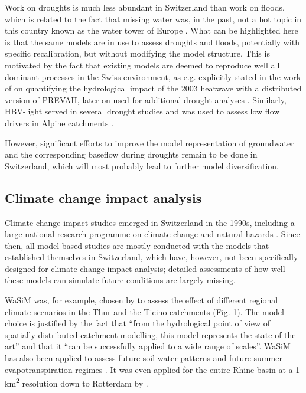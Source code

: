 \documentclass[10pt,a4paper]{article}
\begin{document}
Work on droughts is much less abundant in Switzerland than work on
floods, which is related to the fact that missing water was, in the
past, not a hot topic in this country known as the water tower of
Europe \citep{Milano2015}. What can be highlighted here is that the same
models are in use to assess droughts and floods, potentially with
specific recalibration, but without modifying the model structure. This
is motivated by the fact that existing models are deemed to reproduce
well all dominant processes in the Swiss environment, as e.g. explicitly
stated in the work of \citet{Zappa2007a} on quantifying the hydrological
impact of the 2003 heatwave with a distributed version of PREVAH, later
on used for additional drought analyses \citep{Brunner2019,Zappa2019}. Similarly,
HBV-light served in several drought studies \citep{Staudinger2014,Staudinger2014a,Staudinger2015} 
and was used to assess low flow drivers in Alpine catchments \citep{Arnoux_2020}.

However, significant efforts to improve the model representation of
groundwater and the corresponding baseflow during droughts remain to be
done in Switzerland, which will most probably lead to further model
diversification.

\subsection{Climate change impact analysis}
\label{sec:application:climatechange}

Climate change impact studies emerged in Switzerland in the 1990s,
including a large national research programme on climate change and
natural hazards \citep{snfs}. Since then, all model-based studies
are mostly conducted with the models that established themselves in
Switzerland, which have, however, not been specifically designed for
climate change impact analysis; detailed assessments of how well these
models can simulate future conditions are largely missing.

WaSiM was, for example, chosen by \citet{Jasper2004} to assess the
effect of different regional climate scenarios in the Thur and the
Ticino catchments (Fig. 1). The model choice is justified by the fact
that ``from the hydrological point of view of spatially distributed
catchment modelling, this model represents the state-of-the-art'' and
that it ``can be successfully applied to a wide range of scales''. 
WaSiM has also been applied to assess future soil water
patterns \citep{Jasper2006,Rossler2012} and future summer evapotranspiration
regimes \citep{Calanca2006}. It was even applied for the entire Rhine
basin at a 1 km\textsuperscript{2} resolution down to Rotterdam
by \citet{Kleinn_2005}.
\end{document}

